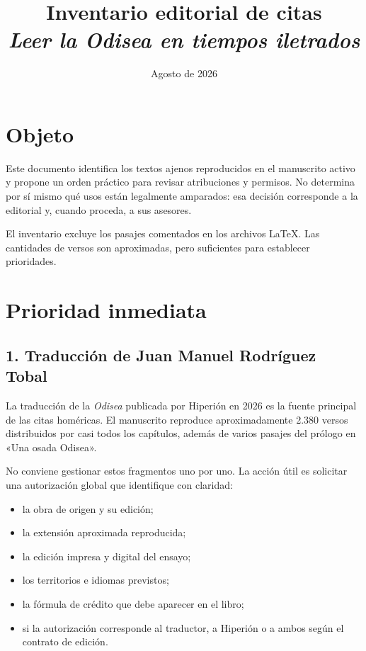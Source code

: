 \documentclass[12pt,a4paper]{article}
\title{Inventario editorial de citas\\[0.4em]\large\emph{Leer la Odisea en tiempos iletrados}}
\author{}
\date{Agosto de 2026}
\begin{document}
\maketitle

\section*{Objeto}

Este documento identifica los textos ajenos reproducidos en el manuscrito activo y propone un orden práctico para revisar atribuciones y permisos. No determina por sí mismo qué usos están legalmente amparados: esa decisión corresponde a la editorial y, cuando proceda, a sus asesores.

El inventario excluye los pasajes comentados en los archivos LaTeX. Las cantidades de versos son aproximadas, pero suficientes para establecer prioridades.

\section*{Prioridad inmediata}

\subsection*{1. Traducción de Juan Manuel Rodríguez Tobal}

La traducción de la \emph{Odisea} publicada por Hiperión en 2026 es la fuente principal de las citas homéricas. El manuscrito reproduce aproximadamente 2.380 versos distribuidos por casi todos los capítulos, además de varios pasajes del prólogo en «Una osada Odisea».

No conviene gestionar estos fragmentos uno por uno. La acción útil es solicitar una autorización global que identifique con claridad:

\begin{itemize}[leftmargin=*]
  \item la obra de origen y su edición;
  \item la extensión aproximada reproducida;
  \item la edición impresa y digital del ensayo;
  \item los territorios e idiomas previstos;
  \item la fórmula de crédito que debe aparecer en el libro;
  \item si la autorización corresponde al traductor, a Hiperión o a ambos según el contrato de edición.
\end{itemize}
\end{document}
